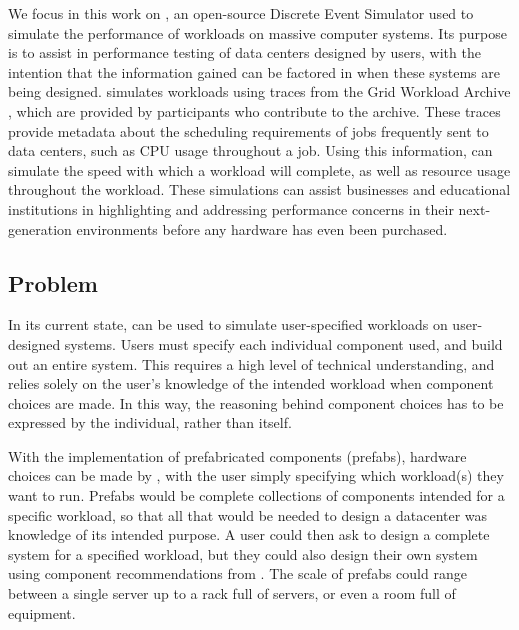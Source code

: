 \documentclass[11pt]{article}
\begin{document}
		We focus in this work on \opendc{}, an open-source Discrete Event Simulator used to simulate the performance of workloads on massive computer systems. 
		Its purpose is to assist in performance testing of data centers designed by users, with the intention that the information gained can be factored in when these systems are being designed. 
		\opendc{} simulates workloads using traces from the Grid Workload Archive \cite{Iosup2008}, which are provided by participants who contribute to the archive. 
		These traces provide metadata about the scheduling requirements of jobs frequently sent to data centers, such as CPU usage throughout a job. 
		Using this information, \opendc{} can simulate the speed with which a workload will complete, as well as resource usage throughout the workload. 
		These simulations can assist businesses and educational institutions in highlighting and addressing performance concerns in their next-generation environments before any hardware has even been purchased.
	
	\subsection{Problem}
		In its current state, \opendc{} can be used to simulate user-specified workloads on user-designed systems. 
		Users must specify each individual component used, and build out an entire system. 
		This requires a high level of technical understanding, and relies solely on the user's knowledge of the intended workload when component choices are made. 
		In this way, the reasoning behind component choices has to be expressed by the individual, rather than \opendc{} itself.  

		With the implementation of prefabricated components (prefabs), hardware choices can be made by \opendc{}, with the user simply specifying which workload(s) they want to run.
		Prefabs would be  complete collections of components intended for a specific workload, so that all that would be needed to design a datacenter was knowledge of its intended purpose.
		A user could then ask \opendc{} to design a complete system for a specified workload, but they could also design their own system using component recommendations from \opendc{}.  
		The scale of prefabs could range between a single server up to a rack full of servers, or even a room full of equipment. 
	
\end{document}
